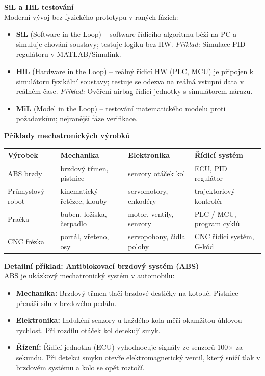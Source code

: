 \documentclass[a4paper,10pt]{article}
\begin{document}
\begin{vysvetlenibox}
\textbf{SiL a HiL testování}\\
Moderní vývoj bez fyzického prototypu v raných fázích:
\begin{itemize}[noitemsep, leftmargin=1.4em, topsep=4pt]
    \item \textbf{SiL} (Software in the Loop) -- software řídicího algoritmu
          běží na PC a simuluje chování soustavy; testuje logiku bez HW.
          \textit{Příklad:} Simulace PID regulátoru v MATLAB/Simulink.
    \item \textbf{HiL} (Hardware in the Loop) -- reálný řídicí HW (PLC, MCU)
          je připojen k simulátoru fyzikální soustavy; testuje se odezva na
          reálná vstupní data v reálném čase.
          \textit{Příklad:} Ověření airbag řídicí jednotky s simulátorem nárazu.
    \item \textbf{MiL} (Model in the Loop) -- testování matematického modelu
          proti požadavkům; nejranější fáze verifikace.
\end{itemize}

\textbf{Příklady mechatronických výrobků}

\begin{center}
\begin{tabularx}{0.95\linewidth}{@{} l X X X @{}}
    \toprule
    \textbf{Výrobek} & \textbf{Mechanika} & \textbf{Elektronika}
                     & \textbf{Řídicí systém} \\
    \midrule
    ABS brzdy        & brzdový třmen, pístnice & senzory otáček kol
                     & ECU, PID regulátor \\
    Průmyslový robot & kinematický řetězec, klouby & servomotory, enkodéry
                     & trajektoriový kontrolér \\
    Pračka           & buben, ložiska, čerpadlo & motor, ventily, senzory
                     & PLC / MCU, program cyklů \\
    CNC frézka       & portál, vřeteno, osy & servopohony, čidla polohy
                     & CNC řídicí systém, G-kód \\
    \bottomrule
\end{tabularx}
\end{center}

\textbf{Detailní příklad: Antiblokovací brzdový systém (ABS)}\\
ABS je ukázkový mechatronický systém v automobilu:
\begin{itemize}[noitemsep, leftmargin=1.4em, topsep=4pt]
    \item \textbf{Mechanika:} Brzdový třmen tlačí brzdové destičky na kotouč.
          Pístnice přenáší sílu z brzdového pedálu.
    \item \textbf{Elektronika:} Indukční senzory u každého kola měří okamžitou
          úhlovou rychlost. Při rozdílu otáček kol detekují smyk.
    \item \textbf{Řízení:} Řídicí jednotka (ECU) vyhodnocuje signály ze senzorů
          100× za sekundu. Při detekci smyku otevře elektromagnetický ventil,
          který sníží tlak v brzdovém systému a kolo se opět roztočí.
\end{itemize}


\end{vysvetlenibox}
\end{document}
